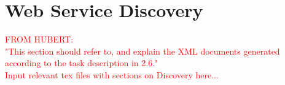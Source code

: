 \chapter{Web Service Discovery}
\textcolor{red}{FROM HUBERT:\\
"This section should refer to, and explain the XML documents generated according to the task description in 2.6."\\
Input relevant tex files with sections on Discovery here...}

